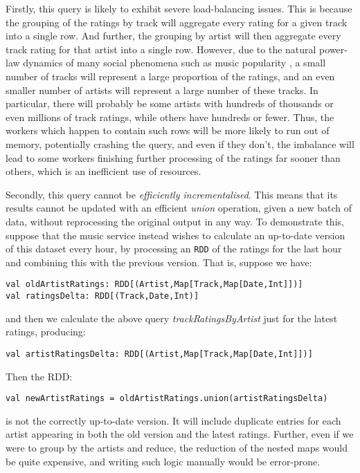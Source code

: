 {Firstly, this query is likely to exhibit severe load-balancing issues. This is because the grouping of the ratings by track will aggregate every rating for a given track into a single row. And further, the grouping by artist will then aggregate every track rating for that artist into a single row. However, due to the natural power-law dynamics of many social phenomena such as music popularity \cite{musicpowerlaw}, a small number of tracks will represent a large proportion of the ratings, and an even smaller number of artists will represent a large number of these tracks. In particular, there will probably be some artists with hundreds of thousands or even millions of track ratings, while others have hundreds or fewer. Thus, the workers which happen to contain such rows will be more likely to run out of memory, potentially crashing the query, and even if they don't, the imbalance will lead to some workers finishing further processing of the ratings far sooner than others, which is an inefficient use of resources.

Secondly, this query cannot be \textit{efficiently incrementalised}. This means that its results cannot be updated with an efficient \textit{union} operation, given a new batch of data, without reprocessing the original output in any way. To demonstrate this, suppose that the music service instead wishes to calculate an up-to-date version of this dataset every hour, by processing an \lstinline{RDD} of the ratings for the last hour and combining this with the previous version. That is, suppose we have:
\vs\begin{lstlisting}
val oldArtistRatings: RDD[(Artist,Map[Track,Map[Date,Int]])]
val ratingsDelta: RDD[(Track,Date,Int)]
\end{lstlisting}\vs
and then we calculate the above query \textit{trackRatingsByArtist} just for the latest ratings, producing:
\vs\begin{lstlisting}
val artistRatingsDelta: RDD[(Artist,Map[Track,Map[Date,Int]])]
\end{lstlisting}\vs
Then the RDD:
\vs\begin{lstlisting}
val newArtistRatings = oldArtistRatings.union(artistRatingsDelta)
\end{lstlisting}\vs
is not the correctly up-to-date version. It will include duplicate entries for each artist appearing in both the old version and the latest ratings. Further, even if we were to group by the artists and reduce, the reduction
of the nested maps would be quite expensive, and writing such logic manually would be error-prone. 
}


